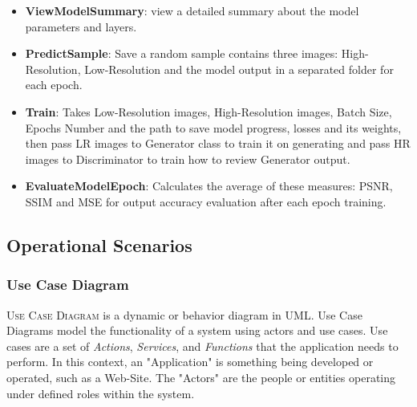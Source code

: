 \documentclass[12pt]{article}
\begin{document}
\begin{itemize}
\begin{itemize}
						\item \textbf{ViewModelSummary}: view a detailed summary about the model parameters and layers.
						\item \textbf{PredictSample}: Save a random sample contains three images: High-Resolution, Low-Resolution and the model output in a separated folder for each epoch.
						\item \textbf{Train}: Takes Low-Resolution images, High-Resolution images, Batch Size, Epochs Number and the path to save model progress, losses and its weights, then pass LR images to Generator class to train it on generating and pass HR images to Discriminator to train how to review Generator output.
						\item \textbf{EvaluateModelEpoch}: Calculates the average of these measures: PSNR, SSIM and MSE for output accuracy evaluation after each epoch training.
					\end{itemize}
			\end{itemize}
		\subsection{Operational Scenarios}
			\subsubsection{Use Case Diagram}
				\textsc{Use Case Diagram} is a dynamic or behavior diagram in UML. Use Case Diagrams model the functionality of a system using actors and use cases. Use cases are a set of \textit{Actions}, \textit{Services}, and \textit{Functions} that the application needs to perform. In this context, an "Application" is something being developed or operated, such as a Web-Site. The "Actors" are the people or entities operating under defined roles within the system.
				
\end{document}

